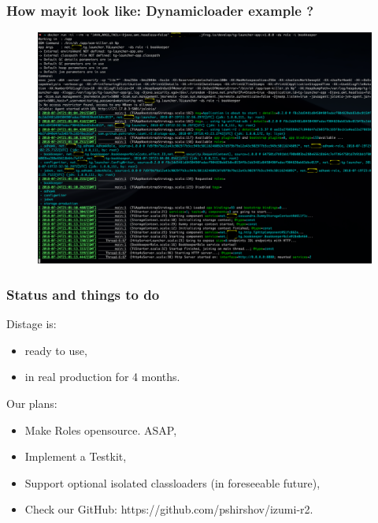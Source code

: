 \documentclass[usenames,dvipsnames]{beamer}
\begin{document}
\begin{frame}
\frametitle{How may\footnotemark[1] it look like: Dynamic\footnotemark[2] loader example ?}
\end{frame}

\begin{frame}
\begin{figure}
    \includegraphics[width=\textwidth]{media/roles-example.png}
\end{figure}
\end{frame}

\begin{frame}
\frametitle{Status and things to do}
Distage is:
\begin{itemize}
\item ready to use,
\item in real production for 4 months.
\end{itemize}
\vspace{0.3cm}
Our plans:
\begin{itemize}
\item Make Roles opensource. ASAP,
\item Implement a Testkit,
\item Support optional isolated classloaders (in foreseeable future),
\item Check our GitHub: https://github.com/pshirshov/izumi-r2.
\end{itemize}
\end{frame}
\end{document}
